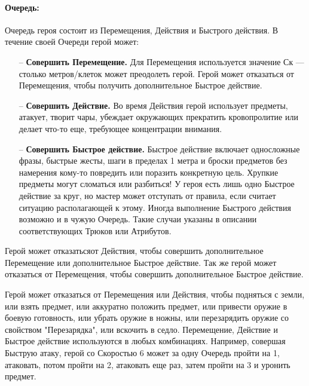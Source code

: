 \paragraph{Очередь:} Очередь героя состоит из Перемещения, Действия и Быстрого действия. В течение своей Очереди герой может:
\begin{itemize}
\item[--] \textbf{Совершить Перемещение.} Для Перемещения используется значение Ск — столько метров/клеток может преодолеть герой. Герой может отказаться от Перемещения, чтобы получить дополнительное Быстрое действие.
\item[--] \textbf{Совершить Действие.} Во время Действия герой использует предметы, атакует, творит чары, убеждает окружающих прекратить кровопролитие или делает что-то еще, требующее концентрации внимания.
\item[--] \textbf{Совершить Быстрое действие.} Быстрое действие включает односложные фразы, быстрые жесты, шаги в пределах 1 метра и броски предметов без намерения кому-то повредить или поразить конкретную цель. Хрупкие предметы могут сломаться или разбиться! У героя есть лишь одно Быстрое действие за круг, но мастер может отступать от правила, если считает ситуацию располагающей к этому. Иногда выполнение Быстрого действия возможно и в чужую Очередь. Такие случаи указаны в описании соответствующих Трюков или Атрибутов.
\end{itemize}
\begin{tcolorbox}
Герой может отказатьсяот Действия, чтобы совершить дополнительное Перемещение или дополнительное Быстрое действие.
\newline
Так же герой может отказаться от Перемещения, чтобы совершить дополнительное Быстрое действие.
\end{tcolorbox}
Герой может отказаться от Перемещения или Действия, чтобы подняться с земли, или взять предмет, или аккуратно положить предмет, или привести оружие в боевую готовность, или убрать оружие в ножны, или перезарядить оружие со свойством "Перезарядка", или вскочить в седло.
\newline
Перемещение, Действие и Быстрое действие используются в любых комбинациях. Например, совершая Быструю атаку, герой со Скоростью 6 может за одну Очередь пройти на 1, атаковать, потом пройти на 2, атаковать еще раз, затем пройти на 3 и уронить предмет.


